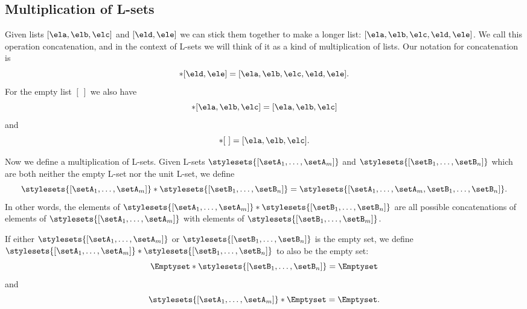 \subsection{Multiplication of L-sets}

Given lists $[\ela, \elb, \elc]$ and $[\eld, \ele]$ we can stick them together to make a longer list: $[\ela, \elb, \elc, \eld, \ele]$. We call this operation concatenation, and in the context of L-sets we will think of it as a kind of multiplication of lists. Our notation for concatenation is
\begin{equation}
[\ela, \elb, \elc] * [\eld, \ele] = [\ela, \elb, \elc, \eld, \ele].
\end{equation}
For the empty list $[ \ ]$ we also have
\begin{equation}
[ \ ] * [\ela, \elb, \elc]  = [\ela, \elb, \elc] 
\end{equation}
and 
\begin{equation}
[\ela, \elb, \elc]  * [ \ ] = [\ela, \elb, \elc]. 
\end{equation}



Now we define a multiplication of L-sets. Given L-sets $\stylesets{[\setA_1, \dots, \setA_m]}$ and $\stylesets{[\setB_1,  \dots, \setB_n]}$ which are both neither the empty L-set nor the unit L-set, we define
\begin{equation}
\stylesets{[\setA_1, \dots, \setA_m]} * \stylesets{[\setB_1, \dots, \setB_n]} = \stylesets{[\setA_1, \dots, \setA_m, \setB_1,  \dots, \setB_n]}.
\end{equation}
In other words, the elements of $\stylesets{[\setA_1, \dots, \setA_m]} * \stylesets{[\setB_1, \dots, \setB_n]}$ are all possible concatenations of elements of $\stylesets{[\setA_1, \dots, \setA_m]}$ with elements of $\stylesets{[\setB_1, \dots, \setB_m]}$. 

If either $\stylesets{[\setA_1, \dots, \setA_m]}$ or $\stylesets{[\setB_1, \dots, \setB_n]}$ is the empty set, we define $\stylesets{[\setA_1, \dots, \setA_m]} * \stylesets{[\setB_1, \dots, \setB_n]}$ to also be the empty set:
\begin{equation}
\Emptyset * \stylesets{[\setB_1, \dots, \setB_n]} = \Emptyset
\end{equation}
and 
\begin{equation}
\stylesets{[\setA_1, \dots, \setA_m]} * \Emptyset = \Emptyset.
\end{equation}


